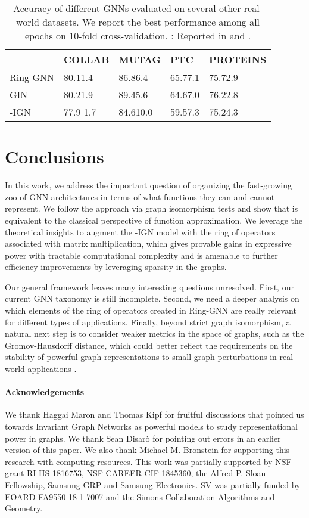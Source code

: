 \documentclass{article}
\begin{document}
\begin{table}[ht]
\centering
\begin{tabular}{l|l|l|l|l}
\hline
            & COLLAB & MUTAG & PTC   & PROTEINS \\ \hline
Ring-GNN     & 80.11.4   & 86.86.4  & 65.77.1  & 75.72.9     \\ \hline
GIN           & 80.21.9   & 89.45.6  & 64.67.0  & 76.22.8     \\ \hline
-IGN  & 77.9  1.7  & 84.610.0 & 59.57.3 & 75.24.3   \\ \hline
\end{tabular}
\vspace{5pt}
\caption{Accuracy of different GNNs evaluated on several other real-world datasets.  We report the best performance among all epochs on 10-fold cross-validation. : Reported in \cite{xu2018powerful} and \cite{maron2018invariant}. }
\label{tab.other}
\end{table}

\section{Conclusions}
In this work, we address the important question of organizing the fast-growing zoo 
of GNN architectures in terms of what functions they can and cannot represent. 
We follow the approach via graph isomorphism tests and show that is equivalent 
to the classical perspective of function approximation. 
We leverage the theoretical insights to augment the -IGN model
with the ring of operators associated with matrix multiplication, which gives provable gains in expressive power with tractable computational complexity and is amenable to further efficiency improvements by leveraging sparsity in the graphs. 

Our general framework leaves many interesting questions unresolved. First, our current GNN taxonomy is still incomplete. Second, we need a deeper analysis on which elements of the ring of operators created in Ring-GNN are really relevant for different types of applications.
Finally, beyond strict graph isomorphism, a natural next step is to consider weaker metrics in the space of graphs, such as the Gromov-Hausdorff distance,
which could better reflect the requirements on the stability of powerful graph representations to small graph perturbations in real-world applications \cite{gama2019stability}. 

\paragraph{Acknowledgements} We thank Haggai Maron and Thomas Kipf for fruitful discussions that pointed us towards Invariant Graph Networks as powerful models to study representational power in graphs. We thank Sean Disar\`{o} for pointing out errors in an earlier version of this paper.
We also thank Michael M. Bronstein for supporting this research with computing resources.
This work was partially supported by NSF grant RI-IIS 1816753, NSF CAREER CIF 1845360, the Alfred P. Sloan Fellowship, Samsung GRP and Samsung Electronics.
SV was partially funded by EOARD FA9550-18-1-7007 and the Simons Collaboration Algorithms and Geometry.
\end{document}
